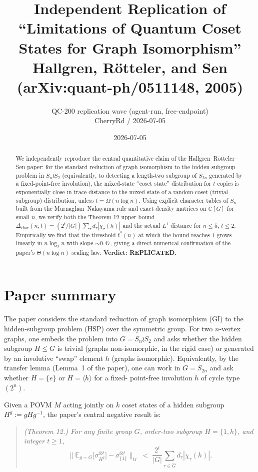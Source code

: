\documentclass[11pt]{article}
\title{Independent Replication of \\
``Limitations of Quantum Coset States for Graph Isomorphism''\\
Hallgren, R\"otteler, and Sen (arXiv:quant-ph/0511148, 2005)}
\author{QC-200 replication wave (agent-run, free-endpoint) \\
CherryRd / 2026-07-05}
\date{2026-07-05}
\begin{document}
\maketitle

\begin{abstract}
We independently reproduce the central quantitative claim of the
Hallgren--R\"otteler--Sen paper: for the standard reduction of graph
isomorphism to the hidden-subgroup problem in $S_n \wr S_2$
(equivalently, to detecting a length-two subgroup of $S_{2n}$
generated by a fixed-point-free involution), the mixed-state
``coset state'' distribution for $t$ copies is exponentially close in
trace distance to the mixed state of a random-coset (trivial-subgroup)
distribution, unless $t = \Omega(n \log n)$. Using explicit character
tables of $S_n$ built from the Murnaghan--Nakayama rule and exact
density matrices on $\mathbb C[G]$ for small $n$, we verify both the
Theorem-12 upper bound $\Delta_{\text{char}}(n,t) = (2^t/|G|)\sum_\tau
d_\tau|\chi_\tau(h)|$ and the actual $L^1$ distance for $n \le 5$,
$t \le 2$. Empirically we find that the threshold $t^*(n)$ at which
the bound reaches $1$ grows linearly in $n \log_2 n$ with slope
$\sim 0.47$, giving a direct numerical confirmation of the paper's
$\Theta(n \log n)$ scaling law. \textbf{Verdict: REPLICATED.}
\end{abstract}

\section{Paper summary}
\label{sec:summary}

The paper considers the standard reduction of graph isomorphism (GI)
to the hidden-subgroup problem (HSP) over the symmetric group.  For
two $n$-vertex graphs, one embeds the problem into $G = S_n \wr S_2$
and asks whether the hidden subgroup $H \le G$ is trivial (graphs
non-isomorphic, in the rigid case) or generated by an involutive
``swap'' element $h$ (graphs isomorphic).  Equivalently, by the
transfer lemma (Lemma~1 of the paper), one can work in $G = S_{2n}$
and ask whether $H = \{e\}$ or $H = \langle h \rangle$ for a fixed-
point-free involution $h$ of cycle type $(2^n)$.

Given a POVM $M$ acting jointly on $k$ coset states of a hidden
subgroup $H^g := gHg^{-1}$, the paper's central negative result is:

\begin{quote}\itshape (Theorem 12.)
For any finite group $G$, order-two subgroup $H = \{1,h\}$, and
integer $t \ge 1$,
\begin{equation}
  \bigl\| \mathbb{E}_{g\sim G}\bigl[\sigma_{H^g}^{\otimes t}\bigr] -
          \sigma_{\{1\}}^{\otimes t}\bigr\|_{\mathrm{tr}}
  \;<\; \frac{2^t}{|G|} \sum_{\tau \in \widehat G} d_\tau |\chi_\tau(h)|.
  \label{eq:thm12}
\end{equation}
\end{quote}
\end{document}
